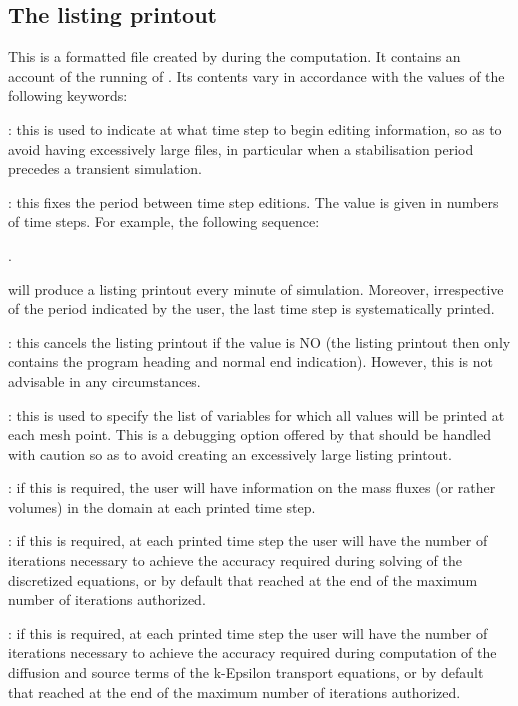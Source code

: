 \subsection{ The listing printout}

 This is a formatted file created by  during the computation. It contains an account of the running of . Its contents vary in accordance with the values of the following keywords:

 : this is used to indicate at what time step to begin editing information, so as to avoid having excessively large files, in particular when a stabilisation period precedes a transient simulation.

 : this fixes the period between time step editions. The value is given in numbers of time steps. For example, the following sequence:

    .


 will produce a listing printout every minute of simulation. Moreover, irrespective of the period indicated by the user, the last time step is systematically printed.

 : this cancels the listing printout if the value is NO (the listing printout then only contains the program heading and normal end indication). However, this is not advisable in any circumstances.

 : this is used to specify the list of variables for which all values will be printed at each mesh point. This is a debugging option offered by  that should be handled with caution so as to avoid creating an excessively large listing printout.

 : if this is required, the user will have information on the mass fluxes (or rather volumes) in the domain at each printed time step.

 : if this is required, at each printed time step the user will have the number of iterations necessary to achieve the accuracy required during solving of the discretized equations, or by default that reached at the end of the maximum number of iterations authorized.

 : if this is required, at each printed time step the user will have the number of iterations necessary to achieve the accuracy required during computation of the diffusion and source terms of the k-Epsilon transport equations, or by default that reached at the end of the maximum number of iterations authorized.

